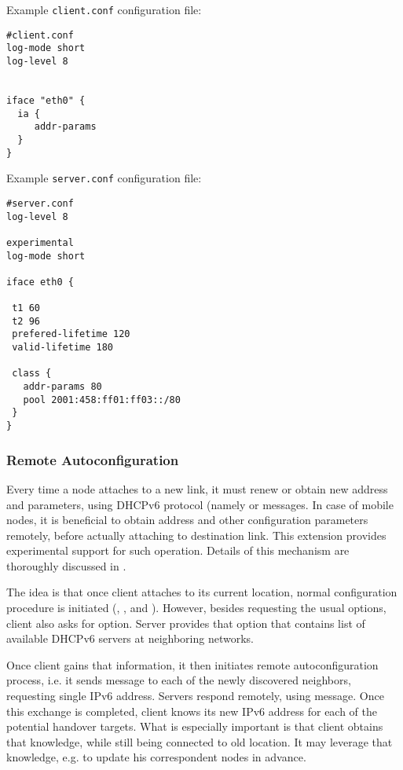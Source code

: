 \begin{enumerate}
Example \verb+client.conf+ configuration file:

\begin{lstlisting}
#client.conf
log-mode short
log-level 8


iface "eth0" {
  ia {
     addr-params
  }
}
\end{lstlisting}

Example \verb+server.conf+ configuration file:

\begin{lstlisting}
#server.conf
log-level 8

experimental
log-mode short

iface eth0 {

 t1 60
 t2 96
 prefered-lifetime 120
 valid-lifetime 180

 class {
   addr-params 80
   pool 2001:458:ff01:ff03::/80
 }
}
\end{lstlisting}

\subsubsection{Remote Autoconfiguration}
\label{feature-remote-autoconf}
Every time a node attaches to a new link, it must renew or
obtain new address and parameters, using DHCPv6 protocol (namely
 or  messages.  In case of mobile nodes,
it is beneficial to obtain address and other  configuration parameters
remotely, before actually attaching to destination link.  This
extension provides experimental support for such operation.
Details of this mechanism are thoroughly discussed in \cite{phd,
  draft-remote-autoconf, networks2010, atnac2010}.

The idea is that once client attaches to its current location, normal
configuration procedure is initiated (, ,
 and ). However, besides requesting the usual
options, client also asks for  option. Server provides
that option that contains list of available DHCPv6 servers at
neighboring networks.

Once client gains that information, it then initiates remote
autoconfiguration process, i.e. it sends  message to each
of the newly discovered neighbors, requesting single IPv6
address. Servers respond remotely, using  message. Once
this exchange is completed, client knows its new IPv6 address for each
of the potential handover targets. What is especially important is
that client obtains that knowledge, while still being connected to old
location. It may leverage that knowledge, e.g. to update his
correspondent nodes in advance.


\end{enumerate}

